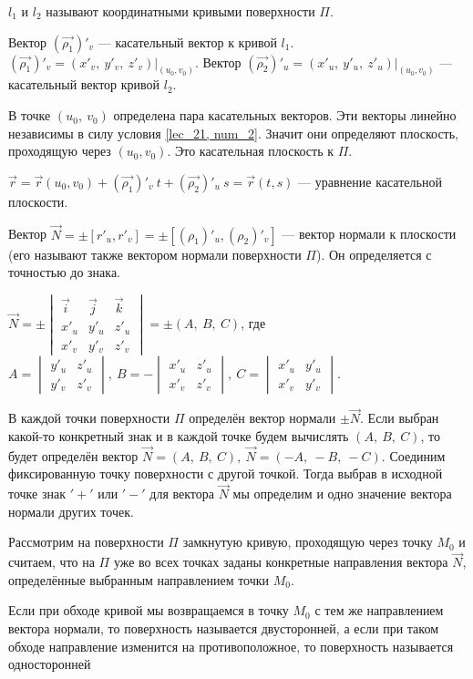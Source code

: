 \documentclass[../../main.tex]{subfiles}
\begin{document}
$l_1$ и $l_2$ называют координатными кривыми поверхности $\Pi$.

Вектор $(\vec{\rho_1})'_v$ --- касательный вектор к кривой $l_1$.
$(\vec{\rho_1})'_v = (x'_v,\ y'_v,\ z'_v) \bigg|_{(u_0,v_0)}$.
Вектор $(\vec{\rho_2})'_u = (x'_u,\ y'_u,\ z'_u) \bigg|_{(u_0,v_0)}$ --- 
касательный вектор кривой $l_2$. 

В точке $(u_0,\ v_0)$ определена пара касательных векторов.
Эти векторы линейно независимы в силу условия \eqref{lec_21, num_2}. 
Значит они определяют плоскость, проходящую через $(u_0,v_0)$.
Это касательная плоскость к $\Pi$. 

$\vec{r} = \vec{r}(u_0,v_0) + (\vec{\rho_1})'_v \ t +
(\vec{\rho_2})'_u \ s = 
\vec{r}(t,s)
$ --- уравнение касательной плоскости.

Вектор $\vec{N} = \pm \left[ r'_u, r'_v \right] = 
\pm \left[ (\rho_1)'_u, (\rho_2)'_v  \right]$ --- 
вектор нормали к плоскости 
(его называют также вектором нормали поверхности $\Pi$).
Он определяется с точностью до знака.

$
\vec{N} = 
\pm \begin{vmatrix}
\vec{i} & \vec{j} & \vec{k} \\
x'_u & y'_u & z'_u \\
x'_v & y'_v & z'_v
\end{vmatrix} = 
\pm (A,\ B,\ C)
$, где $A = \begin{vmatrix}
y'_u & z'_u \\
 y'_v & z'_v
\end{vmatrix},\ 
B = -\begin{vmatrix}
x'_u & z'_u \\
x'_v & z'_v
\end{vmatrix},\
C = \begin{vmatrix}
x'_u & y'_u \\
x'_v & y'_v
\end{vmatrix}
$.

В каждой точки поверхности $\Pi$ определён вектор нормали $\pm \vec{N}$.
Если выбран какой-то конкретный знак и в каждой точке будем вычислять 
$(A,\ B,\ C)$, то будет определён вектор $\vec{N} = (A,\ B,\ C), \
\vec{N} = (-A,\ -B,\ -C)$.
Соединим фиксированную точку поверхности с другой точкой.
Тогда выбрав в исходной точке знак $'+'$ или $'-'$ для вектора $\vec{N}$
мы определим  и одно значение вектора нормали других точек.

Рассмотрим на поверхности $\Pi$ замкнутую кривую, 
проходящую через точку $M_0$ и
считаем, что на $\Pi$ уже во всех точках заданы конкретные направления
вектора $\vec{N}$, определённые выбранным направлением точки $M_0$. 

Если при обходе кривой мы возвращаемся в точку $M_0$ с тем же
направлением вектора нормали, то поверхность называется двусторонней,
а если при таком обходе направление изменится на противоположное,
то поверхность называется односторонней
\end{document}
